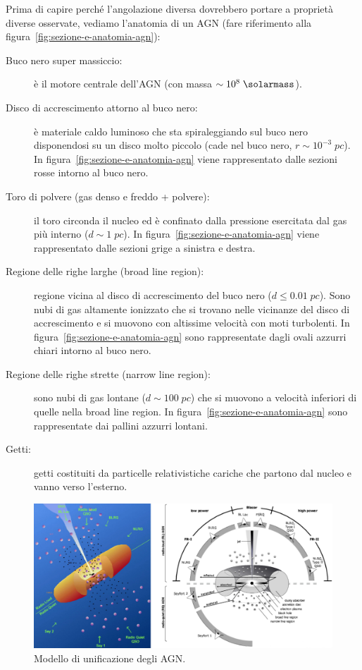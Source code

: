 Prima di capire perché l’angolazione diversa dovrebbero portare a proprietà diverse osservate, vediamo l’anatomia di un AGN (fare riferimento alla figura~\ref{fig:sezione-e-anatomia-agn}):
\begin{description}
    \item[Buco nero super massiccio:] è il motore centrale dell'AGN (con massa $\sim 10^8 \;\si{\solarmass}$).
    \item[Disco di accrescimento attorno al buco nero:] è materiale caldo luminoso che sta spiraleggiando sul buco nero disponendosi su un disco molto piccolo (cade nel buco nero, $r \sim 10^{-3} \;\si{pc}$). In figura~\ref{fig:sezione-e-anatomia-agn} viene rappresentato dalle sezioni rosse intorno al buco nero. 
    \item[Toro di polvere (gas denso e freddo + polvere):] il toro circonda il nucleo ed è confinato dalla pressione esercitata dal gas più interno ($d \sim 1 \;\si{pc}$). In figura~\ref{fig:sezione-e-anatomia-agn} viene rappresentato dalle sezioni grige a sinistra e destra.
    \item[Regione delle righe larghe (broad line region):] regione vicina al disco di accrescimento del buco nero ($d \leq 0.01 \;\si{pc}$). Sono nubi di gas altamente ionizzato che si trovano nelle vicinanze del disco di accrescimento e si muovono con altissime velocità con moti turbolenti. In figura~\ref{fig:sezione-e-anatomia-agn} sono rappresentate dagli ovali azzurri chiari intorno al buco nero. 
    \item[Regione delle righe strette (narrow line region):] sono nubi di gas lontane ($d \sim 100 \;\si{pc}$) che si muovono a velocità inferiori di quelle nella broad line region. In figura~\ref{fig:sezione-e-anatomia-agn} sono rappresentate dai pallini azzurri lontani. 
    \item[Getti:] getti costituiti da particelle relativistiche cariche che partono dal nucleo e vanno verso l’esterno.
\end{description}

\begin{figure}
    \centering
    \includegraphics[width = \textwidth]{immagini/modello-unificazione-agn.png}
    \caption{Modello di unificazione degli AGN.}
    \label{fig:modello-unificazione-agn}
\end{figure}

